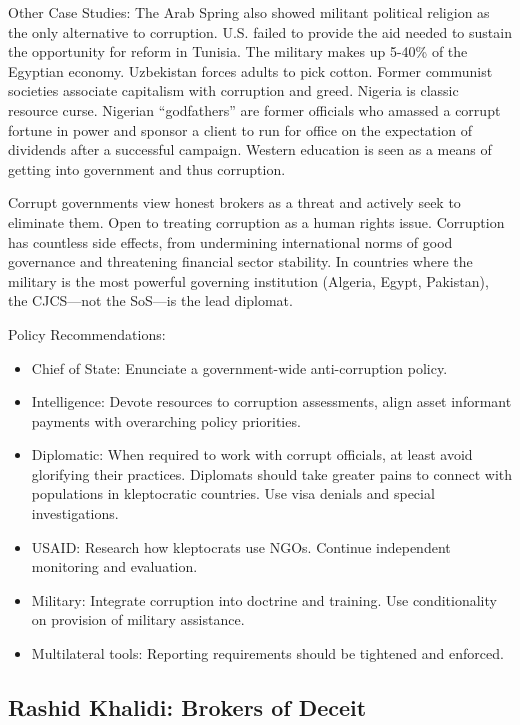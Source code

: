 \documentclass[
]{article}
\begin{document}
Other Case Studies: The Arab Spring also showed militant political
religion as the only alternative to corruption. U.S. failed to provide
the aid needed to sustain the opportunity for reform in Tunisia. The
military makes up 5-40\% of the Egyptian economy. Uzbekistan forces
adults to pick cotton. Former communist societies associate capitalism
with corruption and greed. Nigeria is classic resource curse. Nigerian
``godfathers'' are former officials who amassed a corrupt fortune in
power and sponsor a client to run for office on the expectation of
dividends after a successful campaign. Western education is seen as a
means of getting into government and thus corruption.

Corrupt governments view honest brokers as a threat and actively seek to
eliminate them. Open to treating corruption as a human rights issue.
Corruption has countless side effects, from undermining international
norms of good governance and threatening financial sector stability. In
countries where the military is the most powerful governing institution
(Algeria, Egypt, Pakistan), the CJCS---not the SoS---is the lead
diplomat.

Policy Recommendations:

\begin{itemize}
\item
  Chief of State: Enunciate a government-wide anti-corruption policy.
\item
  Intelligence: Devote resources to corruption assessments, align asset
  informant payments with overarching policy priorities.
\item
  Diplomatic: When required to work with corrupt officials, at least
  avoid glorifying their practices. Diplomats should take greater pains
  to connect with populations in kleptocratic countries. Use visa
  denials and special investigations.
\item
  USAID: Research how kleptocrats use NGOs. Continue independent
  monitoring and evaluation.
\item
  Military: Integrate corruption into doctrine and training. Use
  conditionality on provision of military assistance.
\item
  Multilateral tools: Reporting requirements should be tightened and
  enforced.
\end{itemize}

\hypertarget{rashid-khalidi-brokers-of-deceit}{%
\subsection{Rashid Khalidi: Brokers of
Deceit}\label{rashid-khalidi-brokers-of-deceit}}
\end{document}

